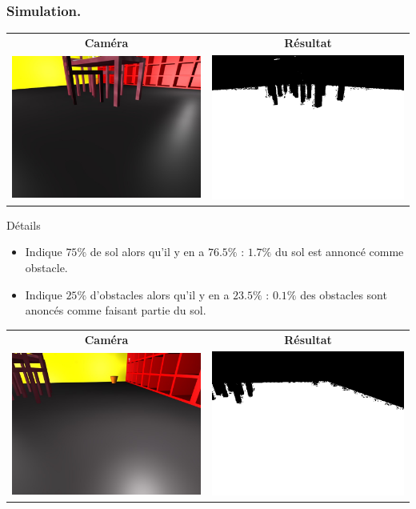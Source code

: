 \begin{frame}
    \frametitle{Simulation.}
    \begin{center}
         {
            \begin{tabular}{cc}
                \textbf{Caméra} & \textbf{Résultat} \\
                \includegraphics[width=0.4\linewidth]{rcs/abodv0s.png} & \includegraphics[width=0.4\linewidth]{rcs/abodv0r.png} \\
            \end{tabular}
            \begin{block}{Détails}
                \begin{itemize}
                    \item Indique $75\%$ de sol alors qu'il y en a $76.5\%$ : $1.7\%$  du sol est annoncé comme obstacle.
                    \item Indique $25\%$ d'obstacles alors qu'il y en a $23.5\%$ : $0.1\%$ des obstacles sont anoncés comme faisant partie du sol.
                \end{itemize}
            \end{block}
        }  {
            \begin{tabular}{cc}
                \textbf{Caméra} & \textbf{Résultat} \\
                \includegraphics[width=0.4\linewidth]{rcs/abodv1s.png} & \includegraphics[width=0.4\linewidth]{rcs/abodv1r.png} \\

\end{tabular}}
\end{center}
\end{frame}

